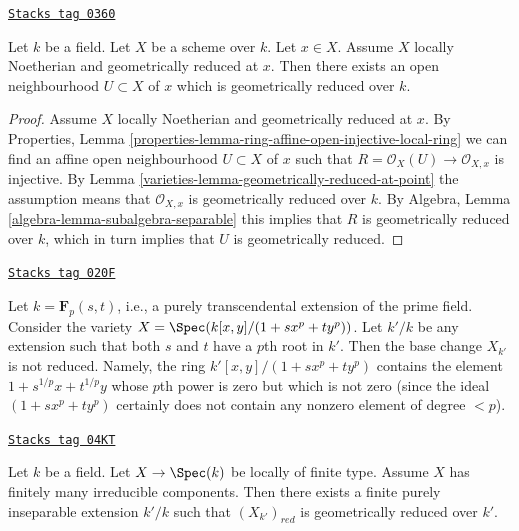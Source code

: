 \begin{lemma}
\label{varieties-lemma-Noetherian-geometrically-reduced-at-point}
\href{https://stacks.math.columbia.edu/tag/0360}{\texttt{Stacks tag 0360}}

Let $k$ be a field.
Let $X$ be a scheme over $k$.
Let $x \in X$.
Assume $X$ locally Noetherian and geometrically reduced at $x$.
Then there exists an open neighbourhood $U \subset X$ of $x$
which is geometrically reduced over $k$.
\end{lemma}

\begin{proof}

Assume $X$ locally Noetherian and geometrically reduced at $x$.
By Properties, Lemma
\ref{properties-lemma-ring-affine-open-injective-local-ring}
we can find an affine open neighbourhood $U \subset X$ of $x$ such that
$R = \mathcal{O}_X(U) \to \mathcal{O}_{X, x}$
is injective. By
Lemma \ref{varieties-lemma-geometrically-reduced-at-point} the assumption
means that $\mathcal{O}_{X, x}$ is geometrically reduced over $k$.
By Algebra, Lemma \ref{algebra-lemma-subalgebra-separable}
this implies that $R$ is geometrically reduced over $k$, which
in turn implies that $U$ is geometrically reduced.
\end{proof}

\begin{example}
\label{varieties-example-not-geometrically-reduced}
\href{https://stacks.math.columbia.edu/tag/020F}{\texttt{Stacks tag 020F}}

Let $k = \mathbf{F}_p(s, t)$, i.e., a purely transcendental extension
of the prime field. Consider the variety
$X = \Spec(k[x, y]/(1 + sx^p + ty^p))$.
Let $k'/k$ be any extension such that
both $s$ and $t$ have a $p$th root in $k'$.
Then the base change $X_{k'}$ is not reduced.
Namely, the ring $k'[x, y]/(1 + s x^p + ty^p)$ contains the element
$1 + s^{1/p}x + t^{1/p}y$ whose $p$th power is zero but
which is not zero (since the ideal $(1 + sx^p + ty^p)$ certainly
does not contain any nonzero element of degree $< p$).
\end{example}

\begin{lemma}
\label{varieties-lemma-finite-extension-geometrically-reduced}
\href{https://stacks.math.columbia.edu/tag/04KT}{\texttt{Stacks tag 04KT}}

Let $k$ be a field.
Let $X \to \Spec(k)$ be locally of finite type.
Assume $X$ has finitely many irreducible components.
Then there exists a finite purely inseparable extension $k'/k$
such that $(X_{k'})_{red}$ is geometrically reduced over $k'$.
\end{lemma}


